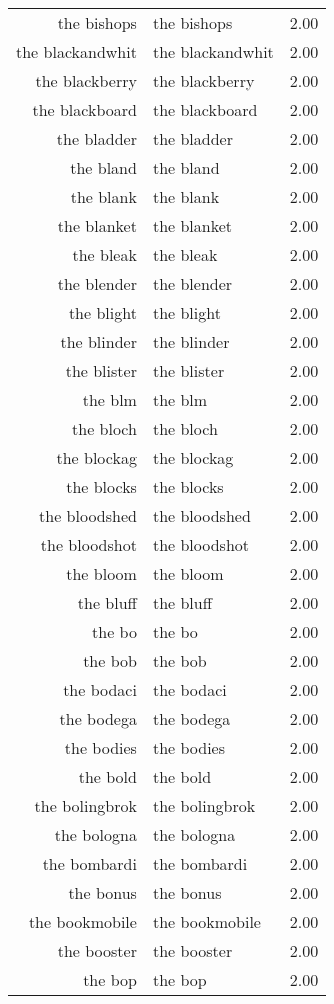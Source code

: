 \begin{table}[ht]
\begin{tabular}{rlr}
  the bishops & the bishops & 2.00 \\ 
  the blackandwhit & the blackandwhit & 2.00 \\ 
  the blackberry & the blackberry & 2.00 \\ 
  the blackboard & the blackboard & 2.00 \\ 
  the bladder & the bladder & 2.00 \\ 
  the bland & the bland & 2.00 \\ 
  the blank & the blank & 2.00 \\ 
  the blanket & the blanket & 2.00 \\ 
  the bleak & the bleak & 2.00 \\ 
  the blender & the blender & 2.00 \\ 
  the blight & the blight & 2.00 \\ 
  the blinder & the blinder & 2.00 \\ 
  the blister & the blister & 2.00 \\ 
  the blm & the blm & 2.00 \\ 
  the bloch & the bloch & 2.00 \\ 
  the blockag & the blockag & 2.00 \\ 
  the blocks & the blocks & 2.00 \\ 
  the bloodshed & the bloodshed & 2.00 \\ 
  the bloodshot & the bloodshot & 2.00 \\ 
  the bloom & the bloom & 2.00 \\ 
  the bluff & the bluff & 2.00 \\ 
  the bo & the bo & 2.00 \\ 
  the bob & the bob & 2.00 \\ 
  the bodaci & the bodaci & 2.00 \\ 
  the bodega & the bodega & 2.00 \\ 
  the bodies & the bodies & 2.00 \\ 
  the bold & the bold & 2.00 \\ 
  the bolingbrok & the bolingbrok & 2.00 \\ 
  the bologna & the bologna & 2.00 \\ 
  the bombardi & the bombardi & 2.00 \\ 
  the bonus & the bonus & 2.00 \\ 
  the bookmobile & the bookmobile & 2.00 \\ 
  the booster & the booster & 2.00 \\ 
  the bop & the bop & 2.00 \\ 

\end{tabular}
\end{table}

